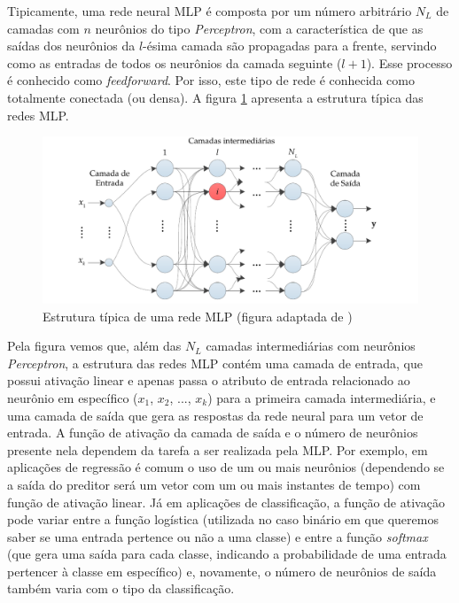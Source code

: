 \documentclass[a4paper, 12pt]{article}
\begin{document}
Tipicamente, uma rede neural MLP é composta por um número arbitrário $N_L$ de  camadas com $n$ neurônios do tipo \textit{Perceptron}, com a característica de que as saídas dos neurônios da $l$-ésima camada são propagadas para a frente, servindo como as entradas de todos os neurônios da camada seguinte ($l+1$). Esse processo é conhecido como \textit{feedforward}. Por isso, este tipo de rede é conhecida como totalmente conectada (ou densa). A figura \ref{fig:mlp-architecture} apresenta a estrutura típica das redes MLP.

\begin{figure}[!ht]
\centering
\includegraphics[scale = 0.8]{mlp-network.pdf}
\caption{Estrutura típica de uma rede MLP (figura adaptada de \cite{boccato2013novas}) }
\label{fig:mlp-architecture}
\end{figure}

Pela figura vemos que, além das $N_L$ camadas intermediárias com neurônios \textit{Perceptron}, a estrutura das redes MLP contém uma camada de entrada, que possui ativação linear e apenas passa o atributo de entrada relacionado ao neurônio em específico ($x_1$, $x_2$, ..., $x_k$) para a primeira camada intermediária, e uma camada de saída que gera as respostas da rede neural para um vetor de entrada. A função de ativação da camada de saída e o número de neurônios presente nela dependem da tarefa a ser realizada pela MLP. Por exemplo, em aplicações de regressão é comum o uso de um ou mais neurônios (dependendo se a saída do preditor será um vetor com um ou mais instantes de tempo) com função de ativação linear. Já em aplicações de classificação, a função de ativação pode variar entre a função logística (utilizada no caso binário em que queremos saber se uma entrada pertence ou não a uma classe) e entre a função \textit{softmax} (que gera uma saída para cada classe, indicando a probabilidade de uma entrada pertencer à classe em específico) e, novamente, o número de neurônios de saída também varia com o tipo da classificação.
\end{document}

